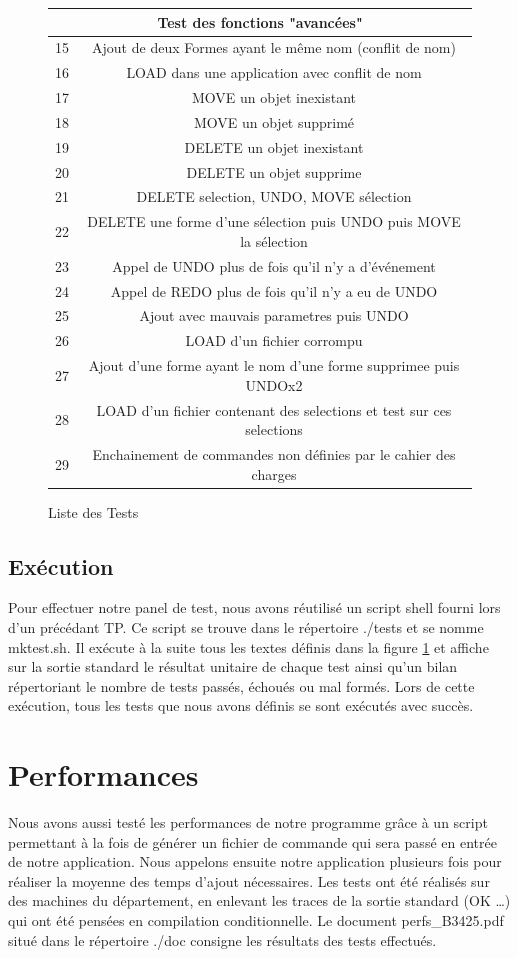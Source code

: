 \documentclass[12pt]{article}
\begin{document}
\begin{figure}[!h]
\begin{center}
\begin{tabular}{|c|c|}
\multicolumn{2}{|c|}{\textbf{\large{Test des fonctions "avancées"}}}\\
\hline
15 & Ajout de deux Formes ayant le même nom (conflit de nom)\\
\hline
16 & LOAD dans une application avec conflit de nom\\
\hline
17 & MOVE un objet inexistant\\
\hline
18 & MOVE un objet supprimé\\
\hline
19 & DELETE un objet inexistant\\
\hline
20 & DELETE un objet supprime\\
\hline
21 & DELETE selection, UNDO, MOVE sélection\\
\hline
22 & DELETE une forme d'une sélection puis UNDO puis MOVE la sélection\\
\hline
23 & Appel de UNDO plus de fois qu'il n'y a d'événement\\
\hline
24 & Appel de REDO plus de fois qu'il n'y a eu de UNDO\\
\hline
25 & Ajout avec mauvais parametres puis UNDO\\
\hline
26 & LOAD d'un fichier corrompu\\
\hline
27 & Ajout d'une forme ayant le nom d'une forme supprimee puis UNDOx2\\
\hline
28 & LOAD d'un fichier contenant des selections et test sur ces selections\\
\hline
29 & Enchainement de commandes non définies par le cahier des charges\\
\hline
\end{tabular}
\end{center}
\caption{Liste des Tests}
\label{tab:Liste des Tests}
\end{figure}
\subsection{Exécution}
Pour effectuer notre panel de test, nous avons réutilisé un script shell fourni lors d'un précédant TP. Ce script se trouve dans le répertoire ./tests et se nomme mktest.sh. Il exécute à la suite tous les textes définis dans la figure \ref{tab:Liste des Tests} et affiche sur la sortie standard le résultat unitaire de chaque test ainsi qu'un bilan répertoriant le nombre de tests passés, échoués ou mal formés. Lors de cette exécution, tous les tests que nous avons définis se sont exécutés avec succès. 

\section{Performances}
Nous avons aussi testé les performances de notre programme grâce à un script permettant à la fois de générer un fichier de commande qui sera passé en entrée de notre application. Nous appelons ensuite notre application plusieurs fois pour réaliser la moyenne des temps d'ajout nécessaires. Les tests ont été réalisés sur des machines du département, en enlevant les traces de la sortie standard (OK \ldots) qui ont été pensées en compilation conditionnelle. Le document perfs\_B3425.pdf situé dans le répertoire ./doc consigne les résultats des tests effectués.
\end{document}
